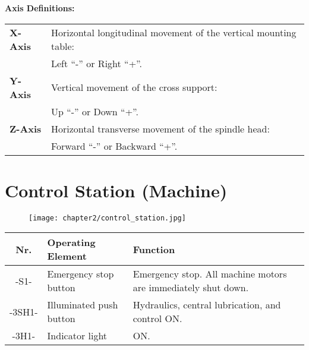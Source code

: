 \vspace{0.5cm}

\textbf{Axis Definitions:}

\begin{tabular}{ l l }
\textbf{X-Axis} & Horizontal longitudinal movement of the vertical mounting table: \\
                & Left \enquote{-} or Right \enquote{+}. \\
\textbf{Y-Axis} & Vertical movement of the cross support: \\
                & Up \enquote{-} or Down \enquote{+}. \\
\textbf{Z-Axis} & Horizontal transverse movement of the spindle head: \\
                & Forward \enquote{-} or Backward \enquote{+}. \\
\end{tabular}

\section{Control Station (Machine)}

\begin{figure}[h]
    \centering
    \texttt{[image: chapter2/control\_station.jpg]} %
\end{figure}


\begin{tabular}{|c|l|p{10cm}|}
    \hline\hline
    \textbf{Nr.} & \textbf{Operating Element} & \textbf{Function} \\
    \hline\hline
    -S1-   & Emergency stop button & Emergency stop. All machine motors are immediately shut down.\footnotemark[11] \\
    \hline
    -3SH1- & Illuminated push button & Hydraulics, central lubrication, and control ON. \\
    -3H1-  & Indicator light & ON. \\
    \hline\hline
\end{tabular}

\vspace{0.5cm}


